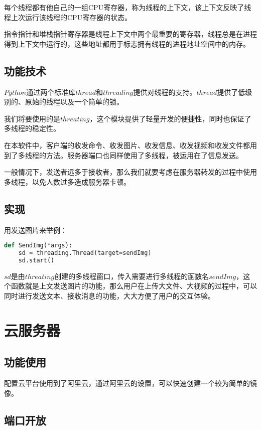 \documentclass[forprint]{sql}
\begin{document}
每个线程都有他自己的一组CPU寄存器，称为线程的上下文，该上下文反映了线程上次运行该线程的CPU寄存器的状态。

指令指针和堆栈指针寄存器是线程上下文中两个最重要的寄存器，线程总是在进程得到上下文中运行的，这些地址都用于标志拥有线程的进程地址空间中的内存。

\subsection{功能技术}

$ Python $通过两个标准库$ thread $和$ threading $提供对线程的支持。$ thread $提供了低级别的、原始的线程以及一个简单的锁。

我们将要使用的是$threating$，这个模块提供了轻量开发的便捷性，同时也保证了多线程的稳定性。

在本软件中，客户端的收发命令、收发图片、收发信息、收发视频和收发文件都用到了多线程的方法。服务器端口也同样使用了多线程，被运用在了信息发送。

一般情况下，发送者远多于接收者，那么我们就要考虑在服务器转发的过程中使用多线程，以免人数过多造成服务器卡顿。

\subsection{实现}

用发送图片来举例：

\begin{lstlisting}[language=Python]
def SendImg(*args):
	sd = threading.Thread(target=sendImg)
	sd.start()
\end{lstlisting}

$sd$是由$threating$创建的多线程窗口，传入需要进行多线程的函数名$sendImg$，这个函数就是上文发送图片的功能，那么用户在上传大文件、大视频的过程中，可以同时进行发送文本、接收消息的功能，大大方便了用户的交互体验。

\section{云服务器}

\subsection{功能使用}

配置云平台使用到了阿里云，通过阿里云的设置，可以快速创建一个较为简单的镜像。

\subsection{端口开放}
\end{document}
